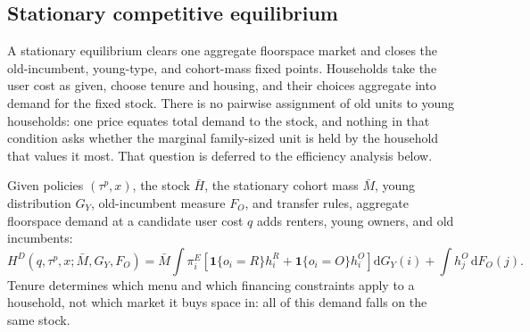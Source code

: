\documentclass[11pt]{article}
\newcommand{\dd}{\mathrm d}
\newcommand{\1}{\mathbf 1}
\begin{document}
\subsection{Stationary competitive equilibrium}

A stationary equilibrium clears one aggregate floorspace market and closes the old-incumbent, young-type, and cohort-mass fixed points. Households take the user cost as given, choose tenure and housing, and their choices aggregate into demand for the fixed stock. There is no pairwise assignment of old units to young households: one price equates total demand to the stock, and nothing in that condition asks whether the marginal family-sized unit is held by the household that values it most. That question is deferred to the efficiency analysis below.

Given policies $(\tau^p,x)$, the stock $\bar H$, the stationary cohort mass $\bar M$, young distribution $G_Y$, old-incumbent measure $F_O$, and transfer rules, aggregate floorspace demand at a candidate user cost $q$ adds renters, young owners, and old incumbents:
\[
H^{D}(q,\tau^p,x;\bar M,G_Y,F_O)
=
\bar M\int \pi_i^E
\left[
\1\{o_i=R\}h_i^R+\1\{o_i=O\}h_i^O
\right]\dd G_Y(i)
+
\int h_j^O\,\dd F_O(j).
\]
Tenure determines which menu and which financing constraints apply to a household, not which market it buys space in: all of this demand falls on the same stock.
\end{document}
